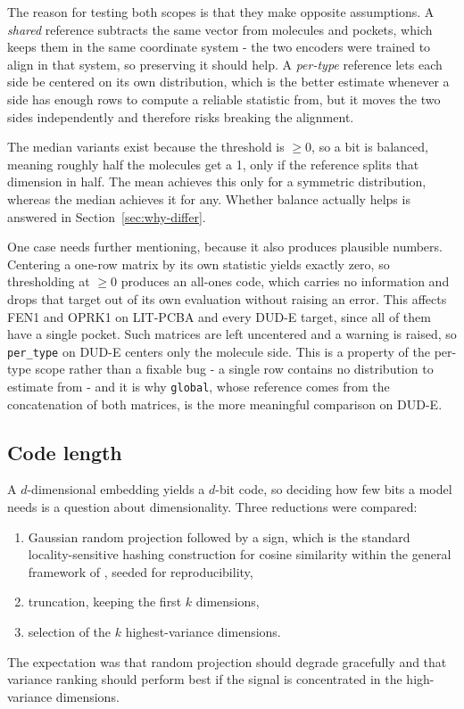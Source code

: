 \documentclass[10pt,a4paper]{article}
\begin{document}
The reason for testing both scopes is that they make opposite assumptions. A \emph{shared}
reference subtracts the same vector from molecules and pockets, which keeps them in the same
coordinate system - the two encoders were trained to align in that system, so preserving it
should help. A \emph{per-type} reference lets each side be centered on its own distribution,
which is the better estimate whenever a side has enough rows to compute a reliable statistic
from, but it moves the two sides independently and therefore risks breaking the alignment.

The median variants exist because the threshold is $\geq 0$, so a bit is balanced, meaning
roughly half the molecules get a 1, only if the reference splits that dimension in half. The
mean achieves this only for a symmetric distribution, whereas the median achieves it for any.
Whether balance actually helps is answered in Section~\ref{sec:why-differ}.

One case needs further mentioning, because it also produces plausible numbers. Centering a
one-row matrix by its own statistic yields exactly zero, so thresholding at $\geq 0$ produces
an all-ones code, which carries no information and drops that target out of its own evaluation
without raising an error. This affects FEN1 and OPRK1 on LIT-PCBA and every DUD-E target,
since all of them have a single pocket. Such matrices are left uncentered and a warning is
raised, so \texttt{per\_type} on DUD-E centers only the molecule side. This is a property of
the per-type scope rather than a fixable bug - a single row contains no distribution to
estimate from - and it is why \texttt{global}, whose reference comes from the concatenation of
both matrices, is the more meaningful comparison on DUD-E.

\subsection{Code length}
A $d$-dimensional embedding yields a $d$-bit code, so deciding how few bits a model needs is a
question about dimensionality. Three reductions were compared:
\begin{enumerate}[leftmargin=*]
\item Gaussian random projection followed by a sign, which is the standard
locality-sensitive hashing construction for cosine similarity \citep{bib:charikar} within the
general framework of \citet{bib:lsh}, seeded for reproducibility,
\item truncation, keeping the first $k$ dimensions,
\item selection of the $k$ highest-variance dimensions.
\end{enumerate}
The expectation was that random projection should degrade gracefully and that variance ranking
should perform best if the signal is concentrated in the high-variance dimensions.
\end{document}
